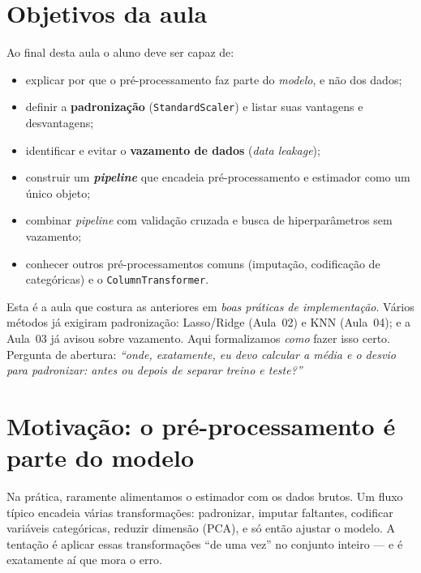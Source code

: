 \documentclass[11pt,a4paper]{article}
\begin{document}

\section*{Objetivos da aula}
Ao final desta aula o aluno deve ser capaz de:
\begin{itemize}[leftmargin=1.4cm]
  \item explicar por que o pré-processamento faz parte do \emph{modelo}, e não dos
        dados;
  \item definir a \textbf{padronização} (\texttt{StandardScaler}) e listar suas
        vantagens e desvantagens;
  \item identificar e evitar o \textbf{vazamento de dados} (\emph{data leakage});
  \item construir um \textbf{\emph{pipeline}} que encadeia pré-processamento e
        estimador como um único objeto;
  \item combinar \emph{pipeline} com validação cruzada e busca de hiperparâmetros
        sem vazamento;
  \item conhecer outros pré-processamentos comuns (imputação, codificação de
        categóricas) e o \texttt{ColumnTransformer}.
\end{itemize}

\begin{emsala}
Esta é a aula que costura as anteriores em \emph{boas práticas de implementação}.
Vários métodos já exigiram padronização: Lasso/Ridge (Aula~02) e KNN (Aula~04); e a
Aula~03 já avisou sobre vazamento. Aqui formalizamos \emph{como} fazer isso certo.
Pergunta de abertura: \emph{``onde, exatamente, eu devo calcular a média e o
desvio para padronizar: antes ou depois de separar treino e teste?''}
\end{emsala}

\section{Motivação: o pré-processamento é parte do modelo}
Na prática, raramente alimentamos o estimador com os dados brutos. Um fluxo típico
encadeia várias transformações: padronizar, imputar faltantes, codificar variáveis
categóricas, reduzir dimensão (PCA), e só então ajustar o modelo. A tentação é
aplicar essas transformações ``de uma vez'' no conjunto inteiro --- e é exatamente aí
que mora o erro.
\end{document}
